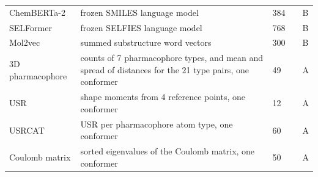 {\begin{longtable}{P{3.0cm}P{5.0cm}P{1.5cm}P{1.5cm}P{1.4cm}}
ChemBERTa-2 & frozen SMILES language model & 384 & \citep{Ahmad2022} & B \\
SELFormer & frozen SELFIES language model & 768 & \citep{Yuksel2023} & B \\
Mol2vec & summed substructure word vectors & 300 & \citep{Jaeger2018} & B \\
3D pharmacophore & counts of 7 pharmacophore types, and mean and spread of distances for the 21 type pairs, one conformer & 49 & \citep{rdkit} & A \\
USR & shape moments from 4 reference points, one conformer & 12 & \citep{Ballester2007} & A \\
USRCAT & USR per pharmacophore atom type, one conformer & 60 & \citep{Schreyer2012} & A \\
Coulomb matrix & sorted eigenvalues of the Coulomb matrix, one conformer & 50 & \citep{Rupp2012} & A \\
\end{longtable}}

